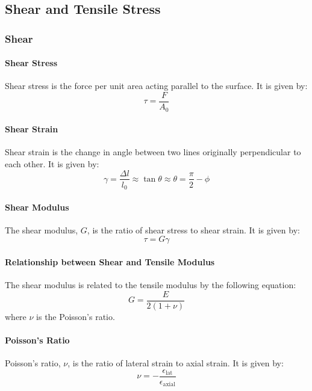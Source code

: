 \documentclass[11pt]{report}
\begin{document}
\subsection{Shear and Tensile Stress}
\subsubsection{Shear}
\paragraph{Shear Stress} Shear stress is the force per unit area acting parallel to the surface. It is given by:
\begin{equation}
    \tau = \frac{F}{A_0}
\end{equation}
\paragraph{Shear Strain} Shear strain is the change in angle between two lines originally perpendicular to each other. It is given by:
\begin{equation}
    \gamma = \frac{\Delta l}{l_0} \approx \tan \theta \approx \theta = \frac{\pi}{2} - \phi
\end{equation}
\paragraph{Shear Modulus} The shear modulus, $G$, is the ratio of shear stress to shear strain. It is given by:
\begin{equation}
    \tau = G \gamma
\end{equation}
\paragraph{Relationship between Shear and Tensile Modulus} The shear modulus is related to the tensile modulus by the following equation:
\begin{equation}
    G = \frac{E}{2(1+\nu)}
\end{equation}
where $\nu$ is the Poisson's ratio.
\paragraph{Poisson's Ratio} Poisson's ratio, $\nu$, is the ratio of lateral strain to axial strain. It is given by:
\begin{equation}
    \nu = -\frac{\epsilon_{\text{lat}}}{\epsilon_{\text{axial}}}
\end{equation}
\end{document}
